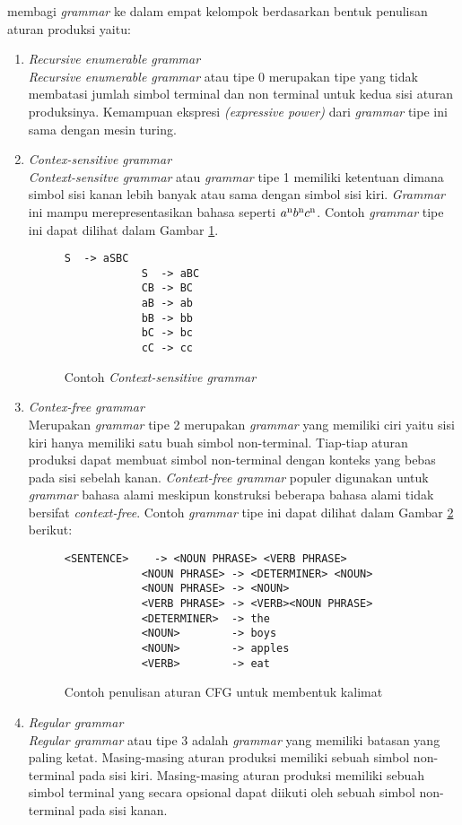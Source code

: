 \citet{bar_feigenbaum} membagi \emph{grammar} ke dalam empat kelompok berdasarkan bentuk penulisan aturan produksi yaitu:
\begin{enumerate}
	\item \emph{Recursive enumerable grammar}\\
	\emph{Recursive enumerable grammar} atau tipe 0 merupakan tipe yang tidak membatasi jumlah simbol terminal dan non terminal untuk kedua sisi aturan produksinya. Kemampuan ekspresi \emph{(expressive power)} dari \emph{grammar} tipe ini sama dengan mesin turing.
	\item \emph{Contex-sensitive grammar}\\
	\emph{Context-sensitve grammar} atau \emph{grammar} tipe 1 memiliki ketentuan dimana simbol sisi kanan lebih banyak atau sama dengan simbol sisi kiri. \emph{Grammar} ini mampu merepresentasikan bahasa seperti $a\textsuperscript{n}b\textsuperscript{n}c\textsuperscript{n}$. Contoh \emph{grammar} tipe ini dapat dilihat dalam Gambar \ref{fig:contoh_csg}.
	\begin{figure}[ht]
		\centering
		\captionsetup{width=0.85\textwidth}
		\begin{lstlisting}[xleftmargin=30pt]
			S  -> aSBC
			S  -> aBC
			CB -> BC
			aB -> ab
			bB -> bb
			bC -> bc
			cC -> cc\end{lstlisting}
		\caption{Contoh \emph{Context-sensitive grammar} \citep{bar_feigenbaum}}
		\label{fig:contoh_csg}
	\end{figure}

	\item \emph{Contex-free grammar}\\
	Merupakan \emph{grammar} tipe 2 merupakan \emph{grammar} yang memiliki ciri yaitu sisi kiri hanya memiliki satu buah simbol non-terminal. Tiap-tiap aturan produksi dapat membuat simbol non-terminal dengan konteks yang bebas pada sisi sebelah kanan. \emph{Context-free grammar} populer digunakan untuk \emph{grammar} bahasa alami meskipun konstruksi beberapa bahasa alami tidak bersifat \emph{context-free}. Contoh \emph{grammar} tipe ini dapat dilihat dalam Gambar \ref{fig:contoh_cfg} berikut:
	\begin{figure}[hb]
		\centering
		\captionsetup{width=0.85\textwidth}
		\begin{lstlisting}[xleftmargin=30pt]
			<SENTENCE>    -> <NOUN PHRASE> <VERB PHRASE>
			<NOUN PHRASE> -> <DETERMINER> <NOUN>
			<NOUN PHRASE> -> <NOUN>
			<VERB PHRASE> -> <VERB><NOUN PHRASE>
			<DETERMINER>  -> the
			<NOUN> 		  -> boys
			<NOUN>		  -> apples
			<VERB>		  -> eat\end{lstlisting}
		\caption{Contoh penulisan aturan CFG untuk membentuk kalimat \citep{bar_feigenbaum}}
		\label{fig:contoh_cfg}
	\end{figure}


	\item \emph{Regular grammar}\\
	\emph{Regular grammar} atau tipe 3 adalah \emph{grammar} yang memiliki batasan yang paling ketat. Masing-masing aturan produksi memiliki sebuah simbol non-terminal pada sisi kiri. Masing-masing aturan produksi memiliki sebuah simbol terminal yang secara opsional dapat diikuti oleh sebuah simbol non-terminal pada sisi kanan.
\end{enumerate}